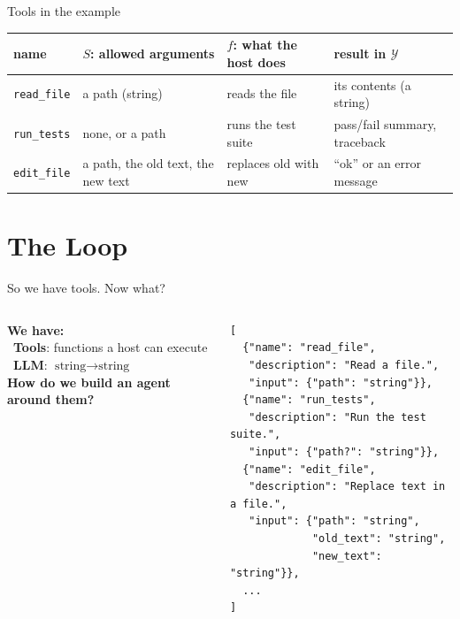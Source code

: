 \documentclass[aspectratio=169,14pt]{beamer}
\begin{document}
\begin{frame}{Tools in the example}
  \small
  \begin{tabular}{@{}l P{3.6cm} P{3.4cm} P{3.4cm}@{}}
    \textbf{name} & \textbf{$S$: allowed arguments} & \textbf{$f$: what the host does} & \textbf{result in $\mathcal{Y}$} \\ \hline
    \rule{0pt}{12pt}\texttt{read\_file} & a path (string) & reads the file & its contents (a string) \\[3pt]
    \texttt{run\_tests} & none, or a path & runs the test suite & pass/fail summary, traceback \\[3pt]
    \texttt{edit\_file} & a path, the old text, the new text & replaces old with new & ``ok'' or an error message \\
  \end{tabular}
\end{frame}

\section{The Loop}

\begin{frame}[fragile,t]{So we have tools. Now what?}
  \vspace{12pt}
  \begin{columns}[c]
    \begin{column}{0.48\textwidth}
      \raggedright\small
      \textbf{We have:}\\[2pt]
      \textbullet~\textbf{Tools}: functions a host can execute\\[1pt]
      \textbullet~\textbf{LLM}: $\text{string} \to \text{string}$\\[8pt]
      {\normalsize\textbf{How do we build an agent around them?}}\\[6pt]
    \end{column}
    \begin{column}{0.50\textwidth}
\begin{lstlisting}[language={},basicstyle=\ttfamily\scriptsize,columns=fullflexible,keepspaces=true,breaklines=false,frame=none,emph={read_file,run_tests,edit_file},emphstyle=\color{actc}]
[
  {"name": "read_file",
   "description": "Read a file.",
   "input": {"path": "string"}},
  {"name": "run_tests",
   "description": "Run the test suite.",
   "input": {"path?": "string"}},
  {"name": "edit_file",
   "description": "Replace text in a file.",
   "input": {"path": "string",
             "old_text": "string",
             "new_text": "string"}},
  ...
]
\end{lstlisting}
    \end{column}
  \end{columns}
\end{frame}
\end{document}

